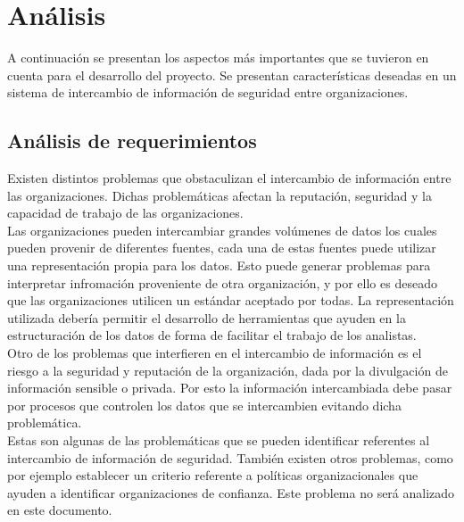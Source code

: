 \setlength\tabcolsep{1mm}
\renewcommand\arraystretch{1.3}
\renewcommand\theFigura{\arabic{Figura}}
\renewcommand\theTabla{\arabic{Tabla}}

\chapter{Análisis}
\label{capitulo3}
	
	A continuación se presentan los aspectos más importantes que se tuvieron en cuenta para el desarrollo del proyecto. Se
	presentan características deseadas en un sistema de intercambio de información de seguridad entre organizaciones.

\section{Análisis de requerimientos}
	Existen distintos problemas que obstaculizan el intercambio de información entre las organizaciones. Dichas
	problemáticas afectan la reputación, seguridad y la capacidad de trabajo de las organizaciones. \\

	Las organizaciones pueden intercambiar grandes volúmenes de datos los cuales pueden provenir de diferentes fuentes, cada
	una de estas fuentes puede utilizar una representación propia para los datos. Esto puede generar problemas para interpretar infromación proveniente de otra organización, y por ello es deseado que las
	organizaciones utilicen un estándar aceptado por todas. La representación utilizada debería permitir el desarrollo de
	herramientas que ayuden en la estructuración de los datos de forma de facilitar el trabajo de los
	analistas.\\

	Otro de los problemas que interfieren en el intercambio de información es el riesgo a la seguridad y reputación de la
	organización, dada por la divulgación de información sensible o privada. Por esto la información intercambiada debe pasar por procesos que controlen los datos que se intercambien evitando dicha problemática.\\

	Estas son algunas de las problemáticas que se pueden identificar referentes al intercambio de información de seguridad.
	También existen otros problemas, como por ejemplo establecer un criterio referente a políticas organizacionales que
	ayuden a identificar organizaciones de confianza. Este problema no será analizado en este documento.\\


